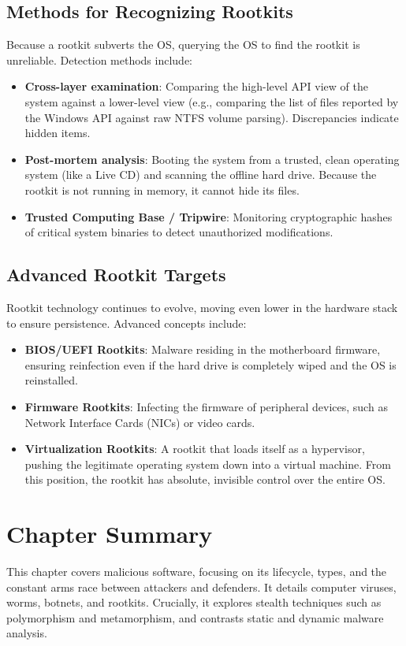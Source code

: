 \subsection{Methods for Recognizing Rootkits}
Because a rootkit subverts the OS, querying the OS to find the rootkit is unreliable. Detection methods include:
\begin{itemize}
    \item \textbf{Cross-layer examination}: Comparing the high-level API view of the system against a lower-level view (e.g., comparing the list of files reported by the Windows API against raw NTFS volume parsing). Discrepancies indicate hidden items.
    \item \textbf{Post-mortem analysis}: Booting the system from a trusted, clean operating system (like a Live CD) and scanning the offline hard drive. Because the rootkit is not running in memory, it cannot hide its files.
    \item \textbf{Trusted Computing Base / Tripwire}: Monitoring cryptographic hashes of critical system binaries to detect unauthorized modifications.
\end{itemize}

\subsection{Advanced Rootkit Targets}
Rootkit technology continues to evolve, moving even lower in the hardware stack to ensure persistence. Advanced concepts include:
\begin{itemize}
    \item \textbf{BIOS/UEFI Rootkits}: Malware residing in the motherboard firmware, ensuring reinfection even if the hard drive is completely wiped and the OS is reinstalled.
    \item \textbf{Firmware Rootkits}: Infecting the firmware of peripheral devices, such as Network Interface Cards (NICs) or video cards.
    \item \textbf{Virtualization Rootkits}: A rootkit that loads itself as a hypervisor, pushing the legitimate operating system down into a virtual machine. From this position, the rootkit has absolute, invisible control over the entire OS.
\end{itemize}

\section*{Chapter Summary}
This chapter covers malicious software, focusing on its lifecycle, types, and the constant arms race between attackers and defenders. It details computer viruses, worms, botnets, and rootkits. Crucially, it explores stealth techniques such as polymorphism and metamorphism, and contrasts static and dynamic malware analysis.

